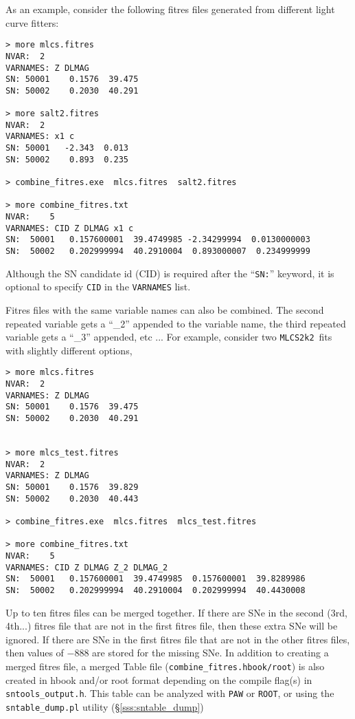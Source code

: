 \documentclass[12pt]{article}
\newcommand{\mlcs}{{\tt MLCS2k2}}
\newcommand{\sndump}{{\tt sntable\_dump.pl}}
\begin{document}
{As an example, consider the following fitres files
generated from different light curve fitters:
\clearpage
\begin{Verbatim}[frame=single]
> more mlcs.fitres
NVAR:  2
VARNAMES: Z DLMAG 
SN: 50001    0.1576  39.475  
SN: 50002    0.2030  40.291  

> more salt2.fitres
NVAR:  2
VARNAMES: x1 c
SN: 50001   -2.343  0.013
SN: 50002    0.893  0.235

> combine_fitres.exe  mlcs.fitres  salt2.fitres

> more combine_fitres.txt
NVAR:    5
VARNAMES: CID Z DLMAG x1 c 
SN:  50001   0.157600001  39.4749985 -2.34299994  0.0130000003
SN:  50002   0.202999994  40.2910004  0.893000007  0.234999999
\end{Verbatim}
%
Although the SN candidate id (CID) is required
after the ``{\tt SN:}'' keyword, it is optional to specify
{\tt CID} in the {\tt VARNAMES} list.

Fitres files with the same variable names can also be combined.
The second repeated variable gets a ``\_2''
appended to the variable name, the third repeated variable
gets a ``\_3'' appended, etc ...
For example, consider two \mlcs\ fits with slightly different
options,


\begin{Verbatim}[frame=single]
> more mlcs.fitres
NVAR:  2
VARNAMES: Z DLMAG 
SN: 50001    0.1576  39.475  
SN: 50002    0.2030  40.291  


> more mlcs_test.fitres
NVAR:  2
VARNAMES: Z DLMAG 
SN: 50001    0.1576  39.829  
SN: 50002    0.2030  40.443  

> combine_fitres.exe  mlcs.fitres  mlcs_test.fitres

> more combine_fitres.txt
NVAR:    5
VARNAMES: CID Z DLMAG Z_2 DLMAG_2 
SN:  50001   0.157600001  39.4749985  0.157600001  39.8289986
SN:  50002   0.202999994  40.2910004  0.202999994  40.4430008
\end{Verbatim}
%
Up to ten fitres files can be merged together.
If there are SNe in the second (3rd, 4th...) fitres file 
that are not in the first fitres file, 
then  these extra SNe will be ignored.
If there are SNe in the first fitres file that are not in
the other fitres files, then values of $-888$ are stored
for the missing SNe.
In addition to creating a merged fitres file, a merged
Table file ({\tt combine\_fitres.hbook/root}) is also created
in hbook and/or root format depending on the compile flag(s)
in {\tt sntools\_output.h}.
This table can be analyzed with {\tt PAW} or {\tt ROOT},
or using the {\sndump} utility (\S\ref{sss:sntable_dump})


}
\end{document}
